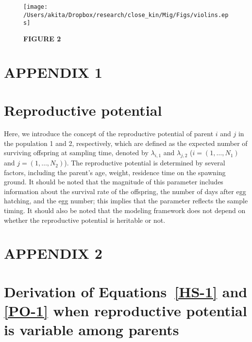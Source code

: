 \documentclass[12pt, English]{article}
\begin{document}
\begin{spacing}{1.9}
\begin{figure}[!h]
	\begin{center}
		\texttt{[image: /Users/akita/Dropbox/research/close\_kin/Mig/Figs/violins.eps]}
		\caption{{\bf FIGURE 2} \figcapb{}}
		\label{violins}
	\end{center}
\end{figure}



\clearpage

\section*{APPENDIX 1}
\setcounter{equation}{0}
\renewcommand{\theequation}{A\arabic{equation}}

\section*{Reproductive potential}

\renewcommand{\theequation}{A\arabic{equation}}
Here, we introduce the concept of the reproductive potential of parent $i$ and $j$ in the population 1 and 2, respectively, which are defined as the expected number of surviving offspring at sampling time, denoted by $\lambda_{i,1}$ and $\lambda_{j,2}$ ($i=(1, \ldots, N_1)$ and $j=(1, \ldots, N_2)$). The reproductive potential is determined by several factors, including the parent's age, weight, residence time on the spawning ground. It should be noted that the magnitude of this parameter includes information about the survival rate of the offspring, the number of days after egg hatching, and the egg number; this implies that the parameter reflects the sample timing. It should also be noted that the modeling framework does not depend on whether the reproductive potential is heritable or not.

\section*{APPENDIX 2}
\section*{Derivation of Equations~\ref{HS-1} and \ref{PO-1} when reproductive potential is variable among parents}


\end{spacing}
\end{document}
